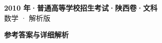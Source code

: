 \documentclass[zihao=-4, a4paper]{ctexart}
\begin{document}
\begin{center}
  {\Large\bfseries 2010 年·普通高等学校招生考试·陕西卷·文科}\\[4pt]
  {\large 数学 · 解析版}
\end{center}
\medskip
{}

\clearpage
{}
\begin{center}{\Large\bfseries 参考答案与详细解析}\end{center}
\medskip

\end{document}
